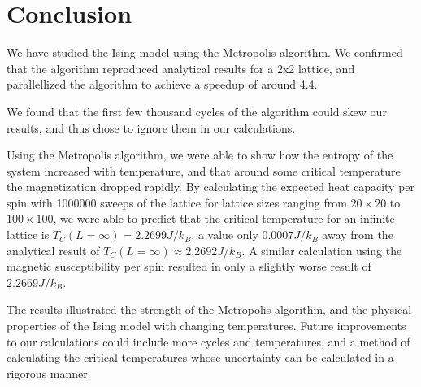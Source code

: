 \documentclass[reprint,english,notitlepage]{revtex4-1}
\begin{document}
\section{Conclusion} %
	We have studied the Ising model using the Metropolis algorithm. We confirmed that the algorithm reproduced analytical results for a 2x2 lattice, and parallellized the algorithm to achieve a speedup of around 4.4.
	
	We found that the first few thousand cycles of the algorithm could skew our results, and thus chose to ignore them in our calculations.
	
	Using the Metropolis algorithm, we were able to show how the entropy of the system increased with temperature, and that around some critical temperature the magnetization dropped rapidly. By calculating the expected heat capacity per spin with 1000000 sweeps of the lattice for lattice sizes ranging from $20 \times 20$ to $100 \times 100$, we were able to predict that the critical temperature for an infinite lattice is $T_C(L = \infty) = 2.2699 J/k_B$, a value only $0.0007J/k_B$ away from the analytical result of $T_C(L = \infty) \approx 2.2692 J/k_B$. A similar calculation using the magnetic susceptibility per spin resulted in only a slightly worse result of $2.2669 J/k_B$.
	
	The results illustrated the strength of the Metropolis algorithm, and the physical properties of the Ising model with changing temperatures. Future improvements to our calculations could include more cycles and temperatures, and a method of calculating the critical temperatures whose uncertainty can be calculated in a rigorous manner.

\begin{figure}  \end{figure}
	
\end{document}
